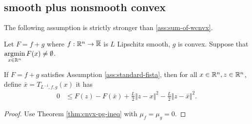 \documentclass[12pt]{report}
\begin{document}
        \subsection{smooth plus nonsmooth convex}
            The following assumption is strictly stronger than \ref{ass:sum-of-wcnvx}. 
            \begin{assumption}\label{ass:standard-fista}
                Let $F = f + g$ where $f:\mathbb R^n\rightarrow \overline {\mathbb R}$ is $L$ Lipschitz smooth, $g$ is convex. 
                Suppose that $\mathop{\rm argmin}\limits_{x \in \mathbb R^n} F(x)\neq \emptyset$.
            \end{assumption}
            \begin{lemma}\label{lemma:fitsa-pg-ineq}
                If $F = f + g$ satisfies Assumption \ref{ass:standard-fista}, then for all $x \in \mathbb R^n, z \in \mathbb R^n$, define $\bar x = T_{L^{-1}, f, g}(x)$ it has 
                \begin{align*}
                    0 &\le F(z) - F(\bar x) + \frac{L}{2}\Vert z - x\Vert^2 - \frac{L}{2}\Vert z - \bar x\Vert^2. 
                \end{align*}
            \end{lemma}
            \begin{proof}
                Use Theorem \ref{thm:cnvx-pg-ineq} with $\mu_f = \mu_g = 0$. 
            \end{proof}
            
\end{document}
